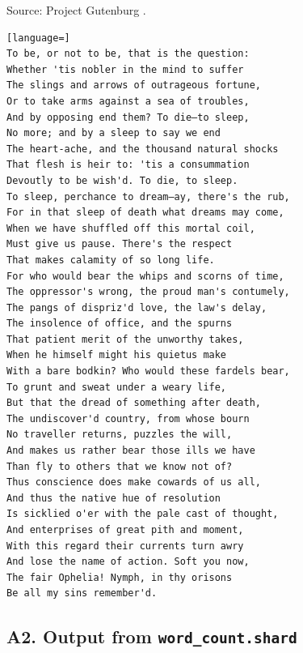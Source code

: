 \documentclass[oneside]{report}
\begin{document}
Source: Project Gutenburg \cite{hamlet}.

\lstset{xleftmargin=15pt}
\begin{lstlisting}[language=]
To be, or not to be, that is the question:
Whether 'tis nobler in the mind to suffer
The slings and arrows of outrageous fortune,
Or to take arms against a sea of troubles,
And by opposing end them? To die—to sleep,
No more; and by a sleep to say we end
The heart-ache, and the thousand natural shocks
That flesh is heir to: 'tis a consummation
Devoutly to be wish'd. To die, to sleep.
To sleep, perchance to dream—ay, there's the rub,
For in that sleep of death what dreams may come,
When we have shuffled off this mortal coil,
Must give us pause. There's the respect
That makes calamity of so long life.
For who would bear the whips and scorns of time,
The oppressor's wrong, the proud man's contumely,
The pangs of dispriz'd love, the law's delay,
The insolence of office, and the spurns
That patient merit of the unworthy takes,
When he himself might his quietus make
With a bare bodkin? Who would these fardels bear,
To grunt and sweat under a weary life,
But that the dread of something after death,
The undiscover'd country, from whose bourn
No traveller returns, puzzles the will,
And makes us rather bear those ills we have
Than fly to others that we know not of?
Thus conscience does make cowards of us all,
And thus the native hue of resolution
Is sicklied o'er with the pale cast of thought,
And enterprises of great pith and moment,
With this regard their currents turn awry
And lose the name of action. Soft you now,
The fair Ophelia! Nymph, in thy orisons
Be all my sins remember'd.
\end{lstlisting}

\subsection{A2. Output from \texttt{word\_count.shard}}
\end{document}
